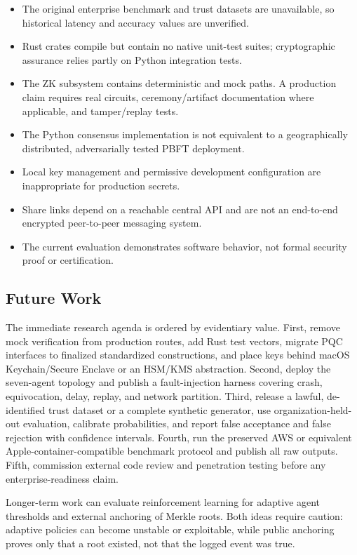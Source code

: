 \documentclass[10pt]{article}
\begin{document}
\begin{itemize}
\item The original enterprise benchmark and trust datasets are unavailable, so historical latency and accuracy values are unverified.
\item Rust crates compile but contain no native unit-test suites; cryptographic assurance relies partly on Python integration tests.
\item The ZK subsystem contains deterministic and mock paths. A production claim requires real circuits, ceremony/artifact documentation where applicable, and tamper/replay tests.
\item The Python consensus implementation is not equivalent to a geographically distributed, adversarially tested PBFT deployment.
\item Local key management and permissive development configuration are inappropriate for production secrets.
\item Share links depend on a reachable central API and are not an end-to-end encrypted peer-to-peer messaging system.
\item The current evaluation demonstrates software behavior, not formal security proof or certification.
\end{itemize}

\subsection*{Future Work}

The immediate research agenda is ordered by evidentiary value. First, remove mock verification from production routes, add Rust test vectors, migrate PQC interfaces to finalized standardized constructions, and place keys behind macOS Keychain/Secure Enclave or an HSM/KMS abstraction. Second, deploy the seven-agent topology and publish a fault-injection harness covering crash, equivocation, delay, replay, and network partition. Third, release a lawful, de-identified trust dataset or a complete synthetic generator, use organization-held-out evaluation, calibrate probabilities, and report false acceptance and false rejection with confidence intervals. Fourth, run the preserved AWS or equivalent Apple-container-compatible benchmark protocol and publish all raw outputs. Fifth, commission external code review and penetration testing before any enterprise-readiness claim.

Longer-term work can evaluate reinforcement learning for adaptive agent thresholds and external anchoring of Merkle roots. Both ideas require caution: adaptive policies can become unstable or exploitable, while public anchoring proves only that a root existed, not that the logged event was true.
\end{document}
